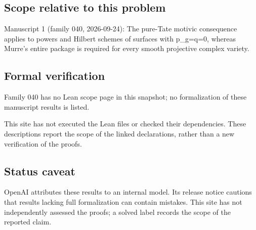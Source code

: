 \documentclass[11pt]{article}
\begin{document}
\subsection{Scope relative to this problem}
Manuscript 1 (family 040, 2026-09-24): The pure-Tate motivic consequence applies to powers and Hilbert schemes of surfaces with p\_g=q=0, whereas Murre’s entire package is required for every smooth projective complex variety.

\subsection{Formal verification}
Family 040 has no Lean scope page in this snapshot; no formalization of these manuscript results is listed.

This site has not executed the Lean files or checked their dependencies. These descriptions report the scope of the linked declarations, rather than a new verification of the proofs.

\subsection{Status caveat}
OpenAI attributes these results to an internal model. Its release notice cautions that results lacking full formalization can contain mistakes. This site has not independently assessed the proofs; a solved label records the scope of the reported claim.
\end{document}
